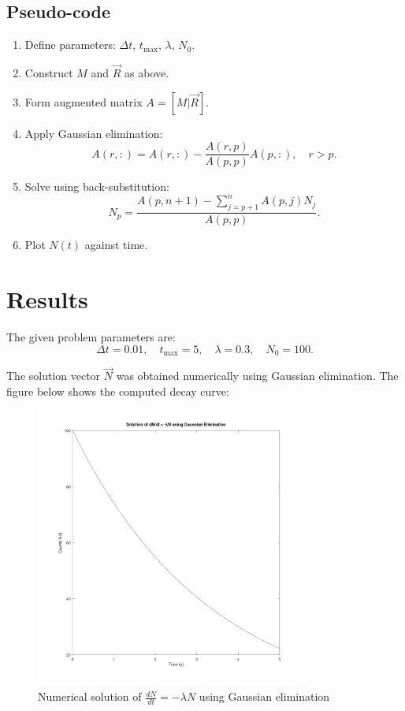 \subsection*{Pseudo-code}
\begin{enumerate}
  \item Define parameters: $\Delta t$, $t_{\max}$, $\lambda$, $N_0$.
  \item Construct $M$ and $\vec{R}$ as above.
  \item Form augmented matrix $A = [M|\vec{R}]$.
  \item Apply Gaussian elimination:
  \[
  A(r,:) = A(r,:) - \frac{A(r,p)}{A(p,p)} A(p,:), \quad r > p.
  \]
  \item Solve using back-substitution:
  \[
  N_p = \frac{A(p,n+1) - \sum_{j=p+1}^n A(p,j)N_j}{A(p,p)}.
  \]
  \item Plot $N(t)$ against time.
\end{enumerate}

\section*{Results} 
The given problem parameters are:
\[
\Delta t = 0.01, \quad t_{\max} = 5, \quad \lambda = 0.3, \quad N_0 = 100.
\]

The solution vector $\vec{N}$ was obtained numerically using Gaussian elimination. The figure below shows the computed decay curve:

\begin{figure}[h!]
  \centering
  \includegraphics[width=0.8\textwidth]{a4.jpg}
  \caption{Numerical solution of $\tfrac{dN}{dt} = -\lambda N$ using Gaussian elimination}
  \label{fig:decay}
\end{figure}

